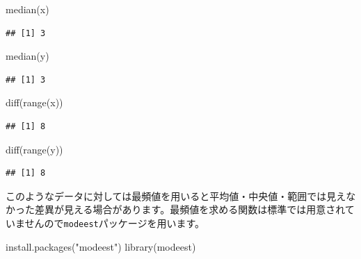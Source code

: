 \documentclass[
  12pt,
]{book}
\newenvironment{Shaded}{\begin{snugshade}}{\end{snugshade}}
\newcommand{\FunctionTok}[1]{\textcolor[rgb]{0.00,0.00,0.00}{#1}}
\newcommand{\NormalTok}[1]{#1}
\newcommand{\StringTok}[1]{\textcolor[rgb]{0.31,0.60,0.02}{#1}}
\begin{document}
\begin{Shaded}
\begin{Highlighting}[numbers=left,,]
\FunctionTok{median}\NormalTok{(x)}
\end{Highlighting}
\end{Shaded}

\begin{verbatim}
## [1] 3
\end{verbatim}

\begin{Shaded}
\begin{Highlighting}[numbers=left,,]
\FunctionTok{median}\NormalTok{(y)}
\end{Highlighting}
\end{Shaded}

\begin{verbatim}
## [1] 3
\end{verbatim}

\begin{Shaded}
\begin{Highlighting}[numbers=left,,]
\FunctionTok{diff}\NormalTok{(}\FunctionTok{range}\NormalTok{(x))}
\end{Highlighting}
\end{Shaded}

\begin{verbatim}
## [1] 8
\end{verbatim}

\begin{Shaded}
\begin{Highlighting}[numbers=left,,]
\FunctionTok{diff}\NormalTok{(}\FunctionTok{range}\NormalTok{(y))}
\end{Highlighting}
\end{Shaded}

\begin{verbatim}
## [1] 8
\end{verbatim}

このようなデータに対しては最頻値を用いると平均値・中央値・範囲では見えなかった差異が見える場合があります。最頻値を求める関数は標準では用意されていませんので\texttt{modeest}パッケージを用います。

\begin{Shaded}
\begin{Highlighting}[numbers=left,,]
\FunctionTok{install.packages}\NormalTok{(}\StringTok{"modeest"}\NormalTok{)}
\FunctionTok{library}\NormalTok{(modeest)}
\end{Highlighting}
\end{Shaded}
\end{document}
